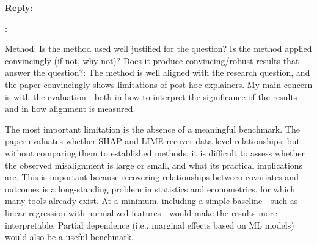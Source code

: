 \documentclass[11pt]{article}
\newcounter{se}[section]
\newcounter{reviewer}
\newcounter{point}[reviewer]
\renewcommand{\thepoint}{R\,\thereviewer.\arabic{point}}
\newenvironment{point}{
    \refstepcounter{point} \bigskip \noindent {\textbf{\thepoint}}: \rmfamily \itshape
}{\medskip}
\newenvironment{reply}
 {\par\medskip \noindent \begin{sf}\textbf{Reply}:\ }
 {\medskip \end{sf}}
\begin{document}
\begin{reply}

\end{reply}


\begin{point}
Method: Is the method used well justified for the question? Is the method applied convincingly (if not, why not)? Does it produce convincing/robust results that answer the question?: The method is well aligned with the research question, and the paper convincingly shows limitations of post hoc explainers. My main concern is with the evaluation---both in how to interpret the significance of the results and in how alignment is measured.

The most important limitation is the absence of a meaningful benchmark. The paper evaluates whether SHAP and LIME recover data-level relationships, but without comparing them to established methods, it is difficult to assess whether the observed misalignment is large or small, and what its practical implications are. This is important because recovering relationships between covariates and outcomes is a long-standing problem in statistics and econometrics, for which many tools already exist. At a minimum, including a simple baseline---such as linear regression with normalized features---would make the results more interpretable. Partial dependence (i.e., marginal effects based on ML models) would also be a useful benchmark.
\end{point}
\end{document}

